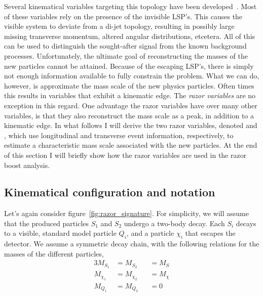 Several kinematical variables targeting this topology have been
developed~\cite{Lester:1999tx,Barr:2003rg,Randall:2008rw,Polesello:2009rn,Bai:2012gs}.
Most of these variables rely on the presence of the invisible LSP's. This causes the visible system
to deviate from a di-jet topology, resulting in possibly large missing transverse momentum, altered
angular distributions, etcetera. All of this can be used to distinguish the sought-after signal
from the known background processes. 
Unfortunately, the ultimate goal of reconstructing the masses of the new particles cannot be
attained. Because of the escaping LSP's, there is simply not enough information available to fully
constrain the problem. What we can do, however, is approximate the mass scale of the new physics
particles. Often times this results in variables that exhibit a kinematic edge. 
The \textit{razor variables} \cite{rogan,Rogan:1557072,Chatrchyan:2011ek,Chatrchyan:2014goa} are no
exception in this regard. One advantage the razor variables have over many other variables, is that
they also reconstruct the mass scale as a peak, in addition to a kinematic edge. 
In what follows I will derive the two razor variables, denoted \mr and \rsq, which use longitudinal
and transverse event information, respectively, to estimate a characteristic mass scale associated
with the new particles. At the end of this section I will briefly show how the razor variables are
used in the razor boost analysis. 


\subsection{Kinematical configuration and notation \label{sec:razor_notation}}

Let's again consider figure~\ref{fig:razor_signature}. For simplicity, we will assume that the
produced particles $S_1$ and $S_2$ undergo a two-body decay. Each $S_i$ decays to a visible,
standard model particle $Q_i$, and a particle $\chi_i$ that escapes the detector. 
We assume a symmetric decay chain, with the following relations for the masses of the different
particles,
\begin{alignat}{3}
  M_{S_1} &= M_{S_2} &&= M_S \label{eq:equal_S_masses}\\
  M_{\chi_1} &= M_{\chi_2} &&= M_{\chi} \label{eq:equal_chi_masses}\\
  M_{Q_1} &= M_{Q_2} &&= 0 \label{eq:no_Q_masses}
\end{alignat}

